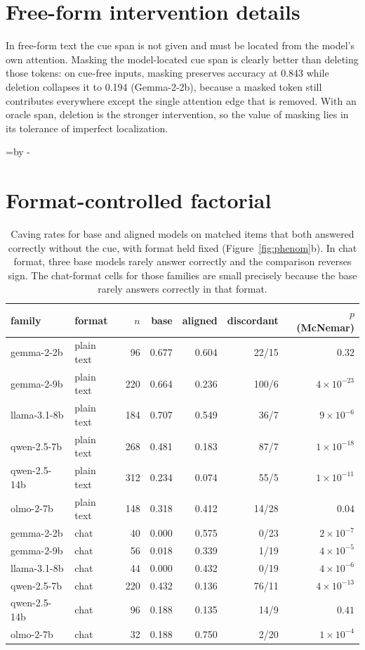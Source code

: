 \documentclass{article}
\newcommand{\needspace}[1]{\par\needspacedim=\pagegoal\advance\needspacedim by -\pagetotal
  \ifdim\needspacedim<#1\relax\newpage\fi}
\begin{document}
\section{Free-form intervention details}
\label{app:freeform}
In free-form text the cue span is not given and must be located from the model's own attention. Masking the model-located cue span is clearly better than deleting those tokens: on cue-free inputs, masking preserves accuracy at 0.843 while deletion collapses it to 0.194 (Gemma-2-2b), because a masked token still contributes everywhere except the single attention edge that is removed. With an oracle span, deletion is the stronger intervention, so the value of masking lies in its tolerance of imperfect localization.

\needspace{24\baselineskip}  %
\section{Format-controlled factorial}
\label{app:factorial}
\begin{table}[h]
\centering\small
\begin{tabular}{llrrrrr}
\toprule
family & format & $n$ & base & aligned & discordant & $p$ (McNemar) \\
\midrule
gemma-2-2b & plain text & 96 & 0.677 & 0.604 & 22/15 & $0.32$ \\
gemma-2-9b & plain text & 220 & 0.664 & 0.236 & 100/6 & $4\times10^{-23}$ \\
llama-3.1-8b & plain text & 184 & 0.707 & 0.549 & 36/7 & $9\times10^{-6}$ \\
qwen-2.5-7b & plain text & 268 & 0.481 & 0.183 & 87/7 & $1\times10^{-18}$ \\
qwen-2.5-14b & plain text & 312 & 0.234 & 0.074 & 55/5 & $1\times10^{-11}$ \\
olmo-2-7b & plain text & 148 & 0.318 & 0.412 & 14/28 & $0.04$ \\
\midrule
gemma-2-2b & chat & 40 & 0.000 & 0.575 & 0/23 & $2\times10^{-7}$ \\
gemma-2-9b & chat & 56 & 0.018 & 0.339 & 1/19 & $4\times10^{-5}$ \\
llama-3.1-8b & chat & 44 & 0.000 & 0.432 & 0/19 & $4\times10^{-6}$ \\
qwen-2.5-7b & chat & 220 & 0.432 & 0.136 & 76/11 & $4\times10^{-13}$ \\
qwen-2.5-14b & chat & 96 & 0.188 & 0.135 & 14/9 & $0.41$ \\
olmo-2-7b & chat & 32 & 0.188 & 0.750 & 2/20 & $1\times10^{-4}$ \\
\bottomrule
\end{tabular}
\caption{Caving rates for base and aligned models on matched items that both answered correctly without the cue, with format held fixed (Figure~\ref{fig:phenom}b). In chat format, three base models rarely answer correctly and the comparison reverses sign. The chat-format cells for those families are small precisely because the base rarely answers correctly in that format.}
\end{table}
\end{document}
